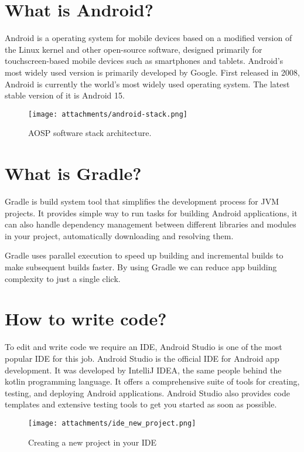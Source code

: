\documentclass[12pt,oneside]{book}
\begin{document}
    \section{What is Android?}
Android is a operating system for mobile devices based on a modified version of the Linux kernel and other open-source software, designed primarily for touchscreen-based mobile devices such as smartphones and tablets. Android's most widely used version is primarily developed by Google. First released in 2008, Android is currently the world's most widely used operating system. The latest stable version of it is Android 15.

\begin{figure}
    \centering
    \texttt{[image: attachments/android-stack.png]}
    \caption{AOSP software stack architecture.}
\end{figure}

    \section{What is Gradle?}
Gradle is build system tool that simplifies the development process for JVM projects. It provides simple way to run tasks for building Android applications, it can also handle dependency management between different libraries and modules in your project, automatically downloading and resolving them.

Gradle uses parallel execution to speed up building and incremental builds to make subsequent builds faster. By using Gradle we can reduce app building complexity to just a single click.

    \section{How to write code?\label{ide}}
To edit and write code we require an IDE, Android Studio is one of the most popular IDE for this job. Android Studio is the official IDE for Android app development. It was developed by IntelliJ IDEA, the same people behind the kotlin programming language. It offers a comprehensive suite of tools for creating, testing, and deploying Android applications. Android Studio also provides code templates and extensive testing tools to get you started as soon as possible.

\begin{figure}
    \centering
    \texttt{[image: attachments/ide\_new\_project.png]}
    \caption{Creating a new project in your IDE}
\end{figure}
\end{document}
